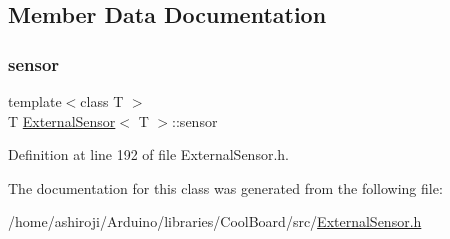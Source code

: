 \subsection{Member Data Documentation}
\mbox{\label{class_external_sensor_a6e1f518119abe08c14b498ce24a7e1b3}} 
\subsubsection{\texorpdfstring{sensor}{sensor}}
{\footnotesize\ttfamily template$<$class T $>$ \\
T \hyperlink{class_external_sensor}{External\+Sensor}$<$ T $>$\+::sensor\hspace{0.3cm}{\ttfamily [private]}}



Definition at line 192 of file External\+Sensor.\+h.



The documentation for this class was generated from the following file\+:\begin{DoxyCompactItemize}
\item 
/home/ashiroji/\+Arduino/libraries/\+Cool\+Board/src/\hyperlink{_external_sensor_8h}{External\+Sensor.\+h}\end{DoxyCompactItemize}
